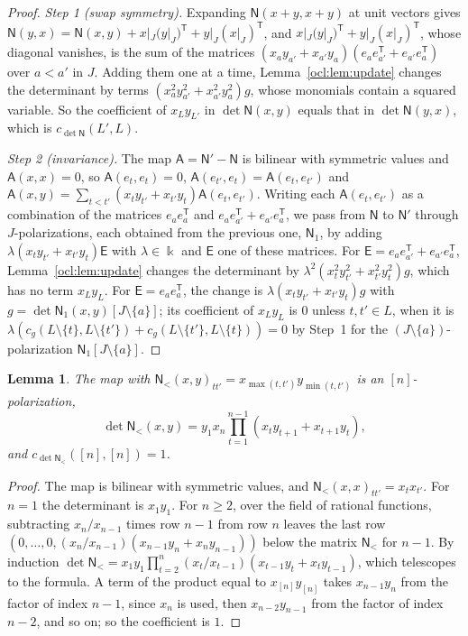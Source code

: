 \documentclass[11pt]{amsart}
\newtheorem{lemma}[theorem]{Lemma}
\theoremstyle{definition}
\theoremstyle{remark}
\numberwithin{equation}{section}
\theoremstyle{plain}
\theoremstyle{definition}
\theoremstyle{plain}
\begin{document}
\begin{proof}
\emph{Step 1 (swap symmetry).} Expanding $\mathsf N(x+y,x+y)$ at unit vectors gives $\mathsf N(y,x)=\mathsf
N(x,y)+x|_J(y|_J)^{\mathsf T}+y|_J(x|_J)^{\mathsf T}$, and $x|_J(y|_J)^{\mathsf T}+y|_J(x|_J)^{\mathsf T}$, whose
diagonal vanishes, is
the sum of the matrices $(x_ay_{a'}+x_{a'}y_a)(e_ae_{a'}^{\mathsf T}+e_{a'}e_a^{\mathsf T})$ over $a<a'$ in $J$. Adding
them one at a time, Lemma~\ref{ocl:lem:update} changes the determinant by terms $(x_a^2y_{a'}^2+x_{a'}^2y_a^2)g$, whose
monomials contain a squared variable. So the coefficient of $x_Ly_{L'}$ in $\det\mathsf N(x,y)$ equals that in
$\det\mathsf N(y,x)$, which is $c_{\det\mathsf N}(L',L)$.

\emph{Step 2 (invariance).} The map $\mathsf A=\mathsf N'-\mathsf N$ is bilinear with symmetric values and $\mathsf
A(x,x)=0$, so $\mathsf A(e_t,e_t)=0$, $\mathsf A(e_{t'},e_t)=\mathsf A(e_t,e_{t'})$ and $\mathsf
A(x,y)=\sum_{t<t'}(x_ty_{t'}+x_{t'}y_t)\mathsf A(e_t,e_{t'})$. Writing each $\mathsf A(e_t,e_{t'})$ as a combination of
the matrices $e_ae_a^{\mathsf T}$ and $e_ae_{a'}^{\mathsf T}+e_{a'}e_a^{\mathsf T}$, we pass from $\mathsf N$ to
$\mathsf N'$ through $J$-polarizations, each obtained from the previous one, $\mathsf N_1$, by adding
$\lambda(x_ty_{t'}+x_{t'}y_t)\mathsf E$ with $\lambda\in\Bbbk$ and $\mathsf E$ one of these matrices. For $\mathsf
E=e_ae_{a'}^{\mathsf T}+e_{a'}e_a^{\mathsf T}$, Lemma~\ref{ocl:lem:update} changes the determinant by
$\lambda^2(x_t^2y_{t'}^2+x_{t'}^2y_t^2)g$, which has no term $x_Ly_L$. For $\mathsf E=e_ae_a^{\mathsf T}$, the change is
$\lambda(x_ty_{t'}+x_{t'}y_t)g$ with $g=\det\mathsf N_1(x,y)[J\setminus\{a\}]$; its coefficient of $x_Ly_L$ is $0$
unless $t,t'\in L$, when it is $\lambda(c_g(L\setminus\{t\},L\setminus\{t'\})+c_g(L\setminus\{t'\},L\setminus\{t\}))=0$
by Step~1 for the $(J\setminus\{a\})$-polarization $\mathsf N_1[J\setminus\{a\}]$.
\end{proof}

\begin{lemma}\label{ocl:lem:reference}
The map with $\mathsf N_<(x,y)_{tt'}=x_{\max(t,t')}y_{\min(t,t')}$ is an $[n]$-polarization,
\[
 \det\mathsf N_<(x,y)=y_1x_n\prod_{t=1}^{n-1}(x_ty_{t+1}+x_{t+1}y_t),
\]
and $c_{\det\mathsf N_<}([n],[n])=1$.
\end{lemma}

\begin{proof}
The map is bilinear with symmetric values, and $\mathsf N_<(x,x)_{tt'}=x_tx_{t'}$. For $n=1$ the determinant is
$x_1y_1$. For $n\ge2$, over the field of rational functions, subtracting $x_n/x_{n-1}$ times row $n-1$ from row $n$
leaves the last row $(0,\dots,0,(x_n/x_{n-1})(x_{n-1}y_n+x_ny_{n-1}))$ below the matrix $\mathsf N_<$ for $n-1$. By
induction $\det\mathsf N_<=x_1y_1\prod_{t=2}^n(x_t/x_{t-1})(x_{t-1}y_t+x_ty_{t-1})$, which telescopes
to the formula. A term of the product equal to $x_{[n]}y_{[n]}$ takes $x_{n-1}y_n$ from the factor of index $n-1$, since
$x_n$ is used, then $x_{n-2}y_{n-1}$ from the factor of index $n-2$, and so on; so the coefficient is $1$.
\end{proof}
\end{document}
